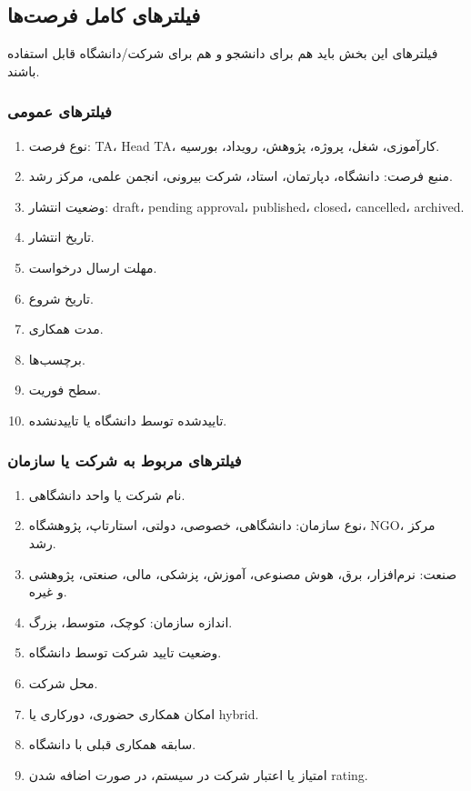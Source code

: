 \documentclass[12pt,a4paper]{article}
\begin{document}
\subsection{فیلترهای کامل فرصت‌ها}
فیلترهای این بخش باید هم برای دانشجو و هم برای شرکت/دانشگاه قابل استفاده باشند.

\subsubsection{فیلترهای عمومی}
\begin{enumerate}
\item نوع فرصت: TA، Head TA، کارآموزی، شغل، پروژه، پژوهش، رویداد، بورسیه.
\item منبع فرصت: دانشگاه، دپارتمان، استاد، شرکت بیرونی، انجمن علمی، مرکز رشد.
\item وضعیت انتشار: draft، pending approval، published، closed، cancelled، archived.
\item تاریخ انتشار.
\item مهلت ارسال درخواست.
\item تاریخ شروع.
\item مدت همکاری.
\item برچسب‌ها.
\item سطح فوریت.
\item تاییدشده توسط دانشگاه یا تاییدنشده.
\end{enumerate}

\subsubsection{فیلترهای مربوط به شرکت یا سازمان}
\begin{enumerate}
\item نام شرکت یا واحد دانشگاهی.
\item نوع سازمان: دانشگاهی، خصوصی، دولتی، استارتاپ، پژوهشگاه، NGO، مرکز رشد.
\item صنعت: نرم‌افزار، برق، هوش مصنوعی، آموزش، پزشکی، مالی، صنعتی، پژوهشی و غیره.
\item اندازه سازمان: کوچک، متوسط، بزرگ.
\item وضعیت تایید شرکت توسط دانشگاه.
\item محل شرکت.
\item امکان همکاری حضوری، دورکاری یا hybrid.
\item سابقه همکاری قبلی با دانشگاه.
\item امتیاز یا اعتبار شرکت در سیستم، در صورت اضافه شدن rating.
\end{enumerate}
\end{document}
